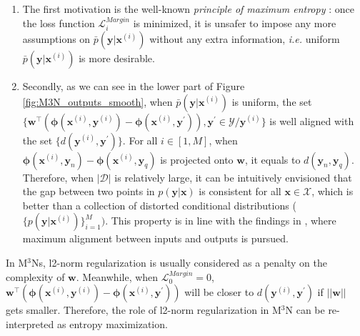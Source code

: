 \begin{enumerate}
        \item The first motivation is   
            the well-known \emph{principle of maximum entropy} \citep{max_entropy_NLP}: once the loss function $\mathcal{L}_i^{Margin}$ is minimized, it is unsafer to impose any more assumptions on $\bar p(\mathbf{y}|\mathbf{x}^{(i)})$ without 
any extra information, \emph{i.e.} uniform $\bar p(\mathbf{y}|\mathbf{x}^{(i)})$  is more desirable.
        \item Secondly, as we can see in the lower part of Figure 
\ref{fig:M3N_outputs_smooth}, when $\bar p(\mathbf{y}|\mathbf{x}^{(i)})$ is uniform, the set 
$\{\mathbf{w}^{\top}(\boldsymbol{\phi}(\mathbf{x}^{(i)},\mathbf{y}^{(i)})-\boldsymbol{\phi}(\mathbf{x}^{(i)},\mathbf{y}^\prime)),\mathbf{y}^\prime\in \mathcal{Y}/\mathbf{y}^{(i)}\}$ is well 
aligned with the set  $\{d(\mathbf{y}^{(i)},\mathbf{y}^\prime)\}$. For all 
$i\in[1,M]$, when $\boldsymbol{\phi}(\mathbf{x}^{(i)},\mathbf{y}_n)-\boldsymbol{\phi}(\mathbf{x}^{(i)},\mathbf{y}_q)$ is projected onto $\mathbf{w}$, it equals 
to $d(\mathbf{y}_n,\mathbf{y}_q)$. Therefore, when $|\mathcal{D}|$ is relatively large, it can be intuitively envisioned that the gap between two points in $p(\mathbf{\mathbf{y}|\mathbf{x}})$ is 
consistent for all $\mathbf{x}\in\mathcal{X}$, which is better than a collection of distorted conditional distributions ($\{p(\mathbf{y}|\mathbf{x}^{(i)})\}_{i=1}^M)$. This property is in line with the findings in \cite{input-output_alignment}, where maximum alignment between inputs and outputs is pursued.      
\end{enumerate}
In M$^3$Ns, l2-norm regularization is usually considered as a penalty on the complexity of $\mathbf{w}$. Meanwhile, when $\mathcal{L}_0^{Margin}=0$,  
$\mathbf{w}^{\top}(\boldsymbol{\phi}(\mathbf{x}^{(i)},\mathbf{y}^{(i)})-\boldsymbol{\phi}(\mathbf{x}^{(i)},\mathbf{y}^\prime))$ will be closer to $d(\mathbf{y}^{(i)},\mathbf{y}^\prime)$ 
if $||\mathbf{w}||$ gets smaller. Therefore, the role of l2-norm regularization in M$^3$N can be re-interpreted as entropy maximization.       
